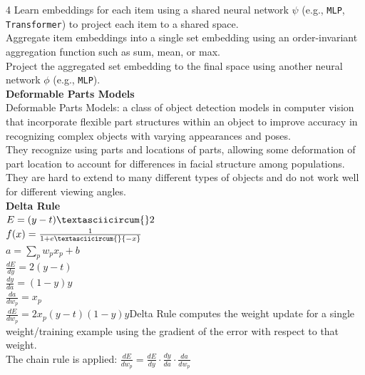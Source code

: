 \documentclass[8pt]{extarticle}
\begin{document}
\begin{multicols}{4}
Learn embeddings for each item using a shared neural network $\psi$ (e.g., \texttt{MLP}, \texttt{Transformer}) to project each item to a shared space.\\
Aggregate item embeddings into a single set embedding using an order-invariant aggregation function such as sum, mean, or max.\\
Project the aggregated set embedding to the final space using another neural network $\phi$ (e.g., \texttt{MLP}).\\
\vspace{2pt}\textbf{Deformable Parts Models}\\
Deformable Parts Models: a class of object detection models in computer vision that incorporate flexible part structures within an object to improve accuracy in recognizing complex objects with varying appearances and poses.\\
They recognize using parts and locations of parts, allowing some deformation of part location to account for differences in facial structure among populations.\\
They are hard to extend to many different types of objects and do not work well for different viewing angles.\\
\vspace{2pt}\textbf{Delta Rule}\\
$E = (y - t)\textasciicircum{}2$\\
$f(x) = \frac{1}{1 + e\textasciicircum{}{-x}}$\\
$a = \sum_{p} w_{p} x_{p} + b$\\
$\frac{dE}{dy} = 2 (y - t)$\\
$\frac{dy}{da} = (1 - y) y$\\
$\frac{da}{dw_{p}} = x_{p}$\\
$\frac{dE}{dw_{p}} = 2 x_{p} (y - t) (1 - y) y$\The Delta Rule computes the weight update for a single weight/training example using the gradient of the error with respect to that weight.\\
The chain rule is applied: $\frac{dE}{dw_{p}} = \frac{dE}{dy}\cdot\frac{dy}{da}\cdot\frac{da}{dw_{p}}$\\


\end{multicols}
\end{document}
